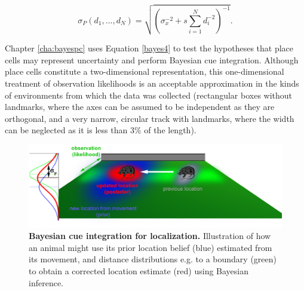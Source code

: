 \begin{equation}\label{bayes4}
\sigma_{P}(d_1, ..., d_N)=\sqrt{(\sigma_x^{-2}+s \sum_{i=1}^{N} d_{i}^{-2})^{-1}}.
\end{equation}

Chapter \ref{cha:bayespc} uses Equation \ref{bayes4} to test the hypotheses that place cells may represent uncertainty and perform Bayesian cue integration. Although place cells constitute a two-dimensional representation, this one-dimensional treatment of observation likelihoods is an acceptable approximation in the kinds of environments from which the data was collected (rectangular boxes without landmarks, where the axes can be assumed to be independent as they are orthogonal, and a very narrow, circular track with landmarks, where the width can be neglected as it is less than $3\%$ of the length). 





\begin{figure}[h]
	\centering
	\includegraphics[width=\textwidth]{img/bayesian_localization3}
	\caption[Bayesian cue integration for localization]{\textbf{Bayesian cue integration for localization.} Illustration of how an animal might use its prior location belief (blue) estimated from its movement, and distance distributions e.g. to a boundary (green) to obtain a corrected location estimate (red) using Bayesian inference.} 
	\label{fig:bayescue} 
\end{figure}

